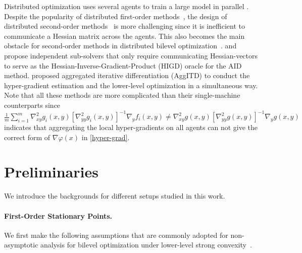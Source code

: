 \documentclass{article}
\begin{document}
Distributed optimization uses 
several agents to
train a large model in parallel \cite{boyd2011distributed,boyd2011convex,mcmahan2017communication,mishchenko2022proxskip,lian2017can,scaman2017optimal}. 
Despite the popularity of distributed first-order methods~\cite{liconvergence,recht2011hogwild,lin2019don,gu2023and,lu2021optimal,kovalev2020optimal,song2021optimal,jordan2018communication}, the design of distributed second-order methods~\cite{reddi2016aide,wang2018giant,safaryan2022fednl,islamov2021distributed,crane2019dingo,shamir2014communication,uribe2020distributed} is more challenging since it is inefficient to communicate a Hessian matrix across the agents.
This also becomes the main obstacle for second-order methods in distributed bilevel optimization~\cite{yangdecentralized,huang2023achieving,tarzanagh2022fednest,lu2022decentralized}. \citet{tarzanagh2022fednest} and \citet{chen2022decentralized} propose independent sub-solvers that only require communicating Hessian-vectors 
to serve as the Hessian-Inverse-Gradient-Product (HIGD) oracle for the AID method. \citet{xiao2023communication} proposed aggregated iterative differentiation (AggITD) to conduct the hyper-gradient
estimation and the lower-level optimization in a simultaneous way. Note that all these methods are more complicated than their single-machine counterparts since $\frac{1}{m} \sum_{i=1}^m  \nabla_{xy}^2 g_i(x,y) [ \nabla_{yy}^2 g_i(x,y) ]^{-1} \nabla_y f_i(x,y) \ne \nabla_{xy}^2 g(x,y) [\nabla_{yy}^2 g(x,y)]^{-1} \nabla_y g(x,y) $ indicates that aggregating the local hyper-gradients on all agents can not give the correct form of $\nabla \varphi(x)$ in \eqref{hyper-grad}. 

\section{Preliminaries}

We introduce the backgrounds for different setups studied in this work.
\paragraph{First-Order Stationary Points.} We first make the following assumptions that are commonly adopted for non-asymptotic analysis for bilevel optimization under lower-level strong convexity~\cite{dagreou2022framework,ji2021bilevel,yang2021provably,ji2022will,ji2021lower,chen2022single,hong2023two}. 
\end{document}

